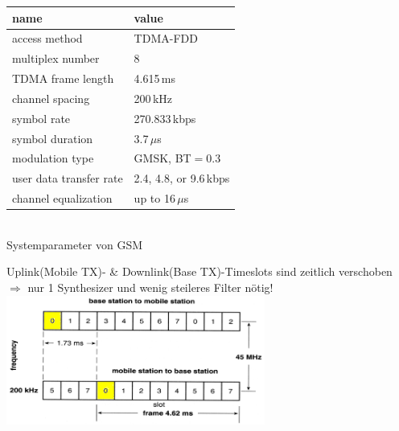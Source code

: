     \begin{minipage}{7.4cm}    
	    \begin{center}
	    \begin{tabular}{|l|l|} \hline
	    name & value \\ \hline \hline
	    access method           & TDMA-FDD \\ \hline
	    multiplex number        & 8 \\ \hline
	    TDMA frame length       & 4.615\,ms \\ \hline
	    channel spacing         & 200\,kHz \\ \hline
	    symbol rate             & 270.833\,kbps \\ \hline
	    symbol duration         & 3.7\,$\mu$s \\ \hline
	    modulation type         & GMSK, BT$=0.3$ \\ \hline
	    user data transfer rate & 2.4, 4.8, or 9.6\,kbps \\ \hline
	    channel equalization    & up to 16\,$\mu$s \\ \hline
	    \end{tabular} \\
	        Systemparameter von GSM
	    \end{center}
    \end{minipage}
    \begin{minipage}{2cm}        
        \quad
    \end{minipage}
    \begin{minipage}{9cm}    
        \footnotesize
        Uplink(Mobile TX)- \& Downlink(Base TX)-Timeslots sind zeitlich verschoben
        $\Rightarrow$ nur 1 Synthesizer und wenig steileres Filter nötig!
        \normalsize    \\
        \includegraphics[width=8.5cm]{./bilder/systems-gsm-ud-slots.png}
    \end{minipage}

